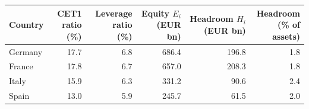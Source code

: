 \begin{tabular*}{\textwidth}{@{\extracolsep{\fill}}lrrrrr@{}}
\toprule
Country & \shortstack{CET1 ratio\\(\%)} & \shortstack{Leverage ratio\\(\%)} & \shortstack{Equity $E_i$\\(EUR bn)} & \shortstack{Headroom $H_i$\\(EUR bn)} & \shortstack{Headroom\\(\% of assets)} \\
\midrule
Germany & 17.7 & 6.8 & 686.4 & 196.8 & 1.8 \\
France & 17.8 & 6.7 & 657.0 & 208.3 & 1.8 \\
Italy & 15.9 & 6.3 & 331.2 & 90.6 & 2.4 \\
Spain & 13.0 & 5.9 & 245.7 & 61.5 & 2.0 \\
\bottomrule
\end{tabular*}
